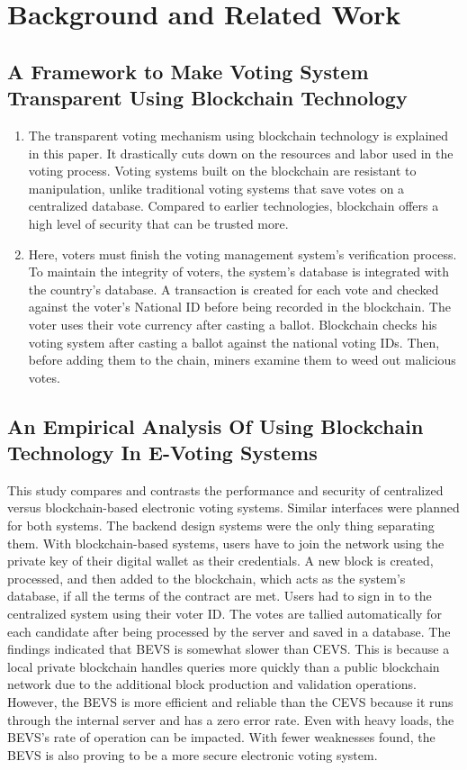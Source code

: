 \documentclass[10pt,final,journal,a4paper,oneside,twocolumn]{IEEEtran}
\begin{document}
	\section{Background and Related Work}

		\subsection{A Framework to Make Voting System Transparent Using Blockchain Technology \cite{farooq2022framework}}
			\begin{enumerate}
				\item The transparent voting mechanism using blockchain technology is explained in this paper. It drastically cuts down on the resources and labor used in the voting process. Voting systems built on the blockchain are resistant to manipulation, unlike traditional voting systems that save votes on a centralized database. Compared to earlier technologies, blockchain offers a high level of security that can be trusted more.
				\item Here, voters must finish the voting management system's verification process. To maintain the integrity of voters, the system's database is integrated with the country's database. A transaction is created for each vote and checked against the voter's National ID before being recorded in the blockchain. The voter uses their vote currency after casting a ballot. Blockchain checks his voting system after casting a ballot against the national voting IDs. Then, before adding them to the chain, miners examine them to weed out malicious votes.
			\end{enumerate}

		\subsection{An Empirical Analysis Of Using Blockchain Technology In E-Voting Systems \cite{cadiz2021empirical}}
			This study compares and contrasts the performance and security of centralized versus blockchain-based electronic voting systems. Similar interfaces were planned for both systems. The backend design systems were the only thing separating them. With blockchain-based systems, users have to join the network using the private key of their digital wallet as their credentials. A new block is created, processed, and then added to the blockchain, which acts as the system's database, if all the terms of the contract are met. Users had to sign in to the centralized system using their voter ID. The votes are tallied automatically for each candidate after being processed by the server and saved in a database. The findings indicated that BEVS is somewhat slower than CEVS. This is because a local private blockchain handles queries more quickly than a public blockchain network due to the additional block production and validation operations. However, the BEVS is more efficient and reliable than the CEVS because it runs through the internal server and has a zero error rate. Even with heavy loads, the BEVS's rate of operation can be impacted. With fewer weaknesses found, the BEVS is also proving to be a more secure electronic voting system.
\end{document}
